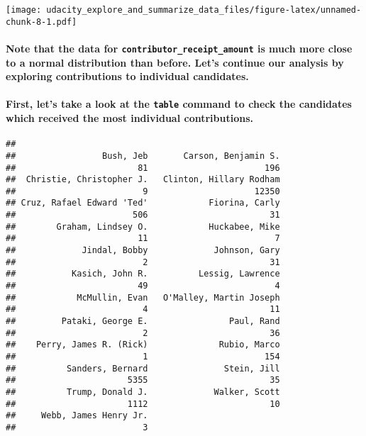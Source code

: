 \documentclass[]{article}
\let\oldparagraph\paragraph
\renewcommand{\paragraph}[1]{\oldparagraph{#1}\mbox{}}
\begin{document}
\texttt{[image: udacity\_explore\_and\_summarize\_data\_files/figure-latex/unnamed-chunk-8-1.pdf]}

\paragraph{\texorpdfstring{Note that the data for
\texttt{contributor\_receipt\_amount} is much more close to a normal
distribution than before. Let's continue our analysis by exploring
contributions to individual
candidates.}{Note that the data for contributor\_receipt\_amount is much more close to a normal distribution than before. Let's continue our analysis by exploring contributions to individual candidates.}}\label{note-that-the-data-for-contributor_receipt_amount-is-much-more-close-to-a-normal-distribution-than-before.-lets-continue-our-analysis-by-exploring-contributions-to-individual-candidates.}

\paragraph{\texorpdfstring{First, let's take a look at the
\texttt{table} command to check the candidates which received the most
individual
contributions.}{First, let's take a look at the table command to check the candidates which received the most individual contributions.}}\label{first-lets-take-a-look-at-the-table-command-to-check-the-candidates-which-received-the-most-individual-contributions.}

\begin{verbatim}
## 
##                 Bush, Jeb       Carson, Benjamin S. 
##                        81                       196 
##  Christie, Christopher J.   Clinton, Hillary Rodham 
##                         9                     12350 
## Cruz, Rafael Edward 'Ted'            Fiorina, Carly 
##                       506                        31 
##        Graham, Lindsey O.            Huckabee, Mike 
##                        11                         7 
##             Jindal, Bobby             Johnson, Gary 
##                         2                        31 
##           Kasich, John R.          Lessig, Lawrence 
##                        49                         4 
##            McMullin, Evan   O'Malley, Martin Joseph 
##                         4                        11 
##         Pataki, George E.                Paul, Rand 
##                         2                        36 
##    Perry, James R. (Rick)              Rubio, Marco 
##                         1                       154 
##          Sanders, Bernard               Stein, Jill 
##                      5355                        35 
##          Trump, Donald J.             Walker, Scott 
##                      1112                        10 
##     Webb, James Henry Jr. 
##                         3
\end{verbatim}
\end{document}
